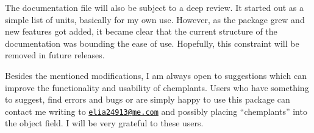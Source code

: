 \documentclass[12pt]{article}						%
\newcommand*{\chemplants}{chemplants}
\newcommand{\mail}[1]{%
		\href{mailto:#1}{\texttt{#1}}%
	}
\begin{document}
The documentation file will also be subject to a deep review. It started out as a
simple list of units, basically for my own use. However, as the package grew and
new features got added, it became clear that the current structure of the
documentation was bounding the ease of use. Hopefully, this constraint will be
removed in future releases.

Besides the mentioned modifications, I am always open to suggestions which can
improve the functionality and usability of \chemplants. Users who have something
to suggest, find errors and bugs or are simply happy to use this package can
contact me writing to \mail{elia24913@me.com} and possibly placing
``\chemplants'' into the object field. I will be very grateful to these users.



\printbibliography[heading=bibintoc]

\end{document}
